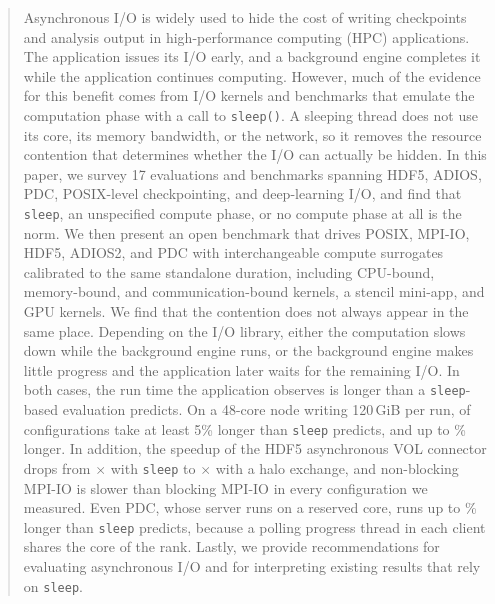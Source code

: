 \begin{abstract}
Asynchronous I/O is widely used to hide the cost of writing checkpoints and
analysis output in high-performance computing (HPC) applications. The
application issues its I/O early, and a background engine completes it while
the application continues computing. However, much of the evidence for this
benefit comes from I/O kernels and benchmarks that emulate the computation
phase with a call to \texttt{sleep()}. A sleeping thread does not use its
core, its memory bandwidth, or the network, so it removes the resource
contention that determines whether the I/O can actually be hidden. In this
paper, we survey 17 evaluations and benchmarks spanning HDF5, ADIOS, PDC,
POSIX-level checkpointing, and deep-learning I/O, and find that
\texttt{sleep}, an unspecified compute phase, or no compute phase at all is
the norm. We then present an open benchmark that drives POSIX, MPI-IO, HDF5,
ADIOS2, and PDC with interchangeable compute surrogates calibrated to the same
standalone duration, including CPU-bound, memory-bound, and
communication-bound kernels, a stencil mini-app, and GPU kernels. We find
that the contention does not always appear in the same place. Depending on
the I/O library, either the computation slows down while the background
engine runs, or the background engine makes little progress and the
application later waits for the remaining I/O. In both cases, the run time
the application observes is longer than a \texttt{sleep}-based evaluation
predicts. On a 48-core node writing 120\,GiB per run, \ExcLongerFive of \ExcN
configurations take at least 5\% longer than \texttt{sleep} predicts, and up
to \ExcMaxPct\% longer. In addition, the speedup of the HDF5 asynchronous VOL
connector drops from \SpHdfSleep$\times$ with \texttt{sleep} to
\SpHdfHalo$\times$ with a halo exchange, and non-blocking MPI-IO is slower
than blocking MPI-IO in every configuration we measured. Even PDC, whose
server runs on a reserved core, runs up to \ExcmaxpctPdc\% longer than
\texttt{sleep} predicts, because a polling progress thread in each client
shares the core of the rank. Lastly, we provide
recommendations for evaluating asynchronous I/O and for interpreting
existing results that rely on \texttt{sleep}.
\end{abstract}
